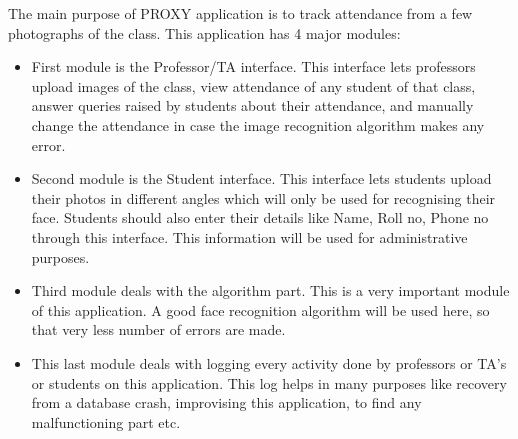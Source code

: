\documentclass[paper=a4, fontsize=15pt]{scrartcl}
\begin{document}
\begin{multicols}{2}

The main purpose of PROXY application is to track attendance from a few photographs of the class. This application has 4 major modules:

\begin{itemize}
    \item First module is the Professor/TA interface. This interface lets professors upload images of the class, view attendance of any student of that class, answer queries raised by students about their attendance, and manually change the attendance in case the image recognition algorithm makes any error.

    \item Second module is the Student interface. This interface lets students upload their photos in different angles which will only be used for recognising their face. Students should also enter their details like Name, Roll no, Phone no through this interface. This information will be used for administrative purposes.
    
    \item Third module deals with the algorithm part. This is a very important module of this application. A good face recognition algorithm will be used here, so that very less number of errors are made.
    
    \item This last module deals with logging every activity done by professors or TA's or students on this application. This log helps in many purposes like recovery from a database crash, improvising this application, to find any malfunctioning part etc.

\end{itemize}

\end{multicols}
\pagebreak
\end{document}
